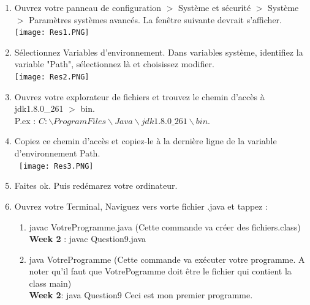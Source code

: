 \begin{enumerate}
    \item Ouvrez votre panneau de configuration $>$ Système et sécurité $>$ Système $>$ Paramètres systèmes avancés. La fenêtre suivante devrait s'afficher.\\
    \texttt{[image: Res1.PNG]}
    \\
    \item Sélectionnez Variables d'environnement. Dans variables système, identifiez la variable "Path", sélectionnez là et choisissez modifier.\\
    \texttt{[image: Res2.PNG]}
    \item Ouvrez votre explorateur de fichiers et trouvez le chemin d'accès à jdk1.8.0\_261 $>$ bin. \\P.ex : $C:\backslash Program Files\backslash Java\backslash jdk1.8.0\_261\backslash bin.$\\
    \item Copiez ce chemin d'accès et copiez-le à la dernière ligne de la variable d'environnement Path.\\\
    \texttt{[image: Res3.PNG]}\\
    \item Faites ok. Puis redémarez votre ordinateur.
    \item Ouvrez votre Terminal, Naviguez vers vorte fichier .java et tappez :
        \begin{enumerate}
            \item javac VotreProgramme.java (Cette commande va créer des fichiers.class)\\
            \textbf{Week 2} : javac Question9.java
            \item java VotreProgramme (Cette commande va exécuter votre programme. A noter qu'il faut que VotrePogramme doit être le fichier qui contient la class main)
            \\\textbf{Week 2}: java Question9 Ceci est mon premier programme.
        \end{enumerate}
    
\end{enumerate}




